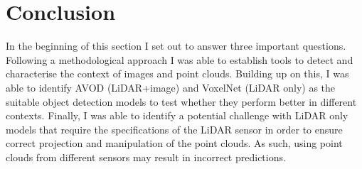 \section{Conclusion}
In the beginning of this section I set out to answer three important questions. Following a methodological approach I was able to establish tools to detect and characterise the context of images and point clouds. Building up on this, I was able to identify AVOD (LiDAR+image) and VoxelNet (LiDAR only) as the suitable object detection models to test whether they perform better in different contexts.
Finally, I was able to identify a potential challenge with LiDAR only models that require the specifications of the LiDAR sensor in order to ensure correct projection and manipulation of the point clouds. As such, using point clouds from different sensors may result in incorrect predictions. 